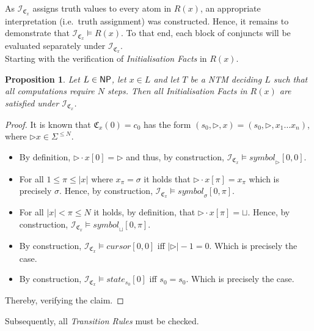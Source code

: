 \documentclass [11pt]{article}
\newtheorem{proposition}[theorem]{Proposition}
\newcommand{\blank}{\sqcup}
\newcommand{\ssym}{\triangleright}
\newcommand{\ccfont}[1]{\protect\mathsf{#1}}
\newcommand{\NP}{\ccfont{NP}}
\newcommand{\sym}[3]{\textit{symbol}_{#1}[#2,#3]}
\newcommand{\cursor}[2]{\textit{cursor}[#1,#2]}
\newcommand{\state}[2]{\textit{state}_{#1}[#2]}
\newcommand{\sequ}[1]{\mathfrak{C}_{#1}}
\newcommand{\sequint}[2]{ \mathcal{#1}_{\mathfrak{C}_{#2}}}
\begin{document}
As $\sequint{I}{x}$ assigns truth values to every atom in $R(x)$, an appropriate interpretation (i.e.\ truth assignment) was constructed. Hence, it remains to demonstrate that $\sequint{I}{x} \models R(x)$.
To that end, each block of conjuncts will be evaluated separately under $\sequint{I}{x}$. \\


Starting with the verification of \emph{Initialisation Facts} in $R(x)$.
\begin{proposition}
\label{prop:r-init}
Let $L \in \NP$, let $x \in L$ and let $T$ be a NTM deciding $L$ such that all computations require $N$ steps. Then all \emph{Initialisation Facts} in $R(x)$ are satisfied under $\sequint{I}{x}$.

\end{proposition}
\begin{proof}
 It is known that $\sequ{x}(0)=c_0$ has the form $(s_0,\triangleright,x)=(s_0,\triangleright,x_1 \dots x_n)$, where $\ssym x \in \Sigma^{\leq N}$. 
\begin{itemize}
\item By definition, $\triangleright \cdot x [0]=\triangleright$ and thus, by construction, $\sequint{I}{x} \models \sym{\ssym}{0}{0}$.
\item For all $1 \leq \pi \leq |x|$ where $x_{\pi}=\sigma$ it holds that  $\ssym \cdot x [\pi]=x_{\pi}$ which is precisely $\sigma$. Hence, by construction, $\sequint{I}{x} \models\sym{\sigma}{0}{\pi}$.
\item For all $|x| < \pi \leq N$ it holds, by definition, that  $\ssym \cdot x [\pi]=\blank$. Hence, by construction, $\sequint{I}{x} \models \sym{\blank}{0}{\pi}$.
\item By construction, $\sequint{I}{x} \models \cursor{0}{0}$  iff $|\ssym|-1=0$. Which is precisely the case.
\item By construction, $\sequint{I}{x} \models \state{s_0}{0}$ iff $s_0=s_0$. Which is precisely the case.
\end{itemize}
Thereby, verifying the claim.
\end{proof}

Subsequently, all \emph{Transition Rules} must be checked. 
\end{document}
